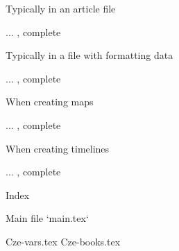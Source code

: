 {{{{{{{\secc Typically in an article file

... \TODO, complete

\secc Typically in a file with formatting data

... \TODO, complete

\secc When creating maps

... \TODO, complete

\secc When creating timelines

... \TODO, complete




\sec Index

\def\_sortinglang{en}
\typosize[9/]
\makeindex
\endmulti

\bye





 Main file `main.tex`

\begtt
\load[opbible] %
\cslang

\def\shadowparameter{.1}%



\def\tmark {BKR} %

 {Cze-vars.tex} %
 {Cze-books.tex} %

\def\txsfile {sources/Cze\tmark-\bmark.txs} %
\def\fmtfile {formats/fmt-Cze\tmark-\amark.tex} %
\def\notesfile {notes/notes-\amark.tex} %
\def\introfile {others/intro-\amark.tex} %
\def\articlefile {others/articles-\amark.tex} %

}}}}}}}
